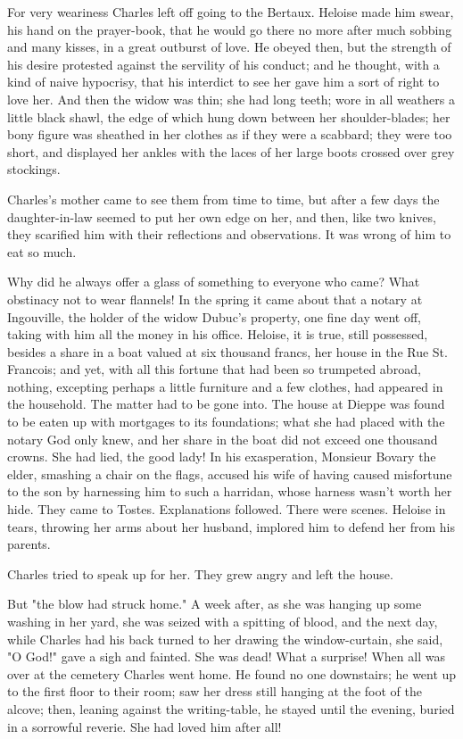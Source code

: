\documentclass[11pt,twocolumn]{ltugboat}
\begin{document}
For very weariness Charles left off going to the Bertaux. Heloise made
him swear, his hand on the prayer-book, that he would go there no more
after much sobbing and many kisses, in a great outburst of love. He
obeyed then, but the strength of his desire protested against the
servility of his conduct; and he thought, with a kind of naive
hypocrisy, that his interdict to see her gave him a sort of right to
love her. And then the widow was thin; she had long teeth; wore in all
weathers a little black shawl, the edge of which hung down between her
shoulder-blades; her bony figure was sheathed in her clothes as if they
were a scabbard; they were too short, and displayed her ankles with the
laces of her large boots crossed over grey stockings.

Charles's mother came to see them from time to time, but after a few
days the daughter-in-law seemed to put her own edge on her, and
then, like two knives, they scarified him with their reflections and
observations. It was wrong of him to eat so much.

Why did he always offer a glass of something to everyone who came?
What obstinacy not to wear flannels! In the spring it came about that a
notary at Ingouville, the holder of the widow Dubuc's property, one fine
day went off, taking with him all the money in his office. Heloise,
it is true, still possessed, besides a share in a boat valued at six
thousand francs, her house in the Rue St. Francois; and yet, with all
this fortune that had been so trumpeted abroad, nothing, excepting
perhaps a little furniture and a few clothes, had appeared in the
household. The matter had to be gone into. The house at Dieppe was found
to be eaten up with mortgages to its foundations; what she had placed
with the notary God only knew, and her share in the boat did not exceed
one thousand crowns. She had lied, the good lady! In his exasperation,
Monsieur Bovary the elder, smashing a chair on the flags, accused his
wife of having caused misfortune to the son by harnessing him to such
a harridan, whose harness wasn't worth her hide. They came to Tostes.
Explanations followed. There were scenes. Heloise in tears, throwing her
arms about her husband, implored him to defend her from his parents.

Charles tried to speak up for her. They grew angry and left the house.

But "the blow had struck home." A week after, as she was hanging up some
washing in her yard, she was seized with a spitting of blood, and
the next day, while Charles had his back turned to her drawing the
window-curtain, she said, "O God!" gave a sigh and fainted. She was
dead! What a surprise! When all was over at the cemetery Charles went
home. He found no one downstairs; he went up to the first floor to
their room; saw her dress still hanging at the foot of the alcove; then,
leaning against the writing-table, he stayed until the evening, buried
in a sorrowful reverie. She had loved him after all!
\end{document}
